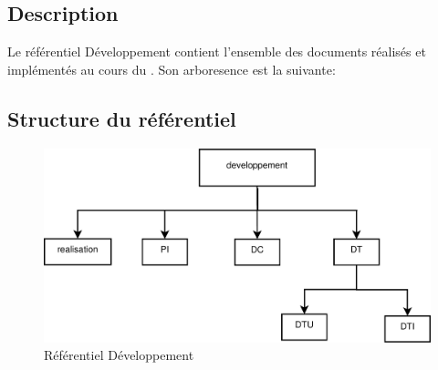 \subsection{Description}

Le référentiel Développement contient l’ensemble des documents réalisés et implémentés au cours du \picCourt. Son arboresence est la suivante:

\subsection{Structure du référentiel}

\begin{figure}[ht]
         \begin{center}
         \includegraphics[scale=0.5]{images/arboDeveloppement}
         \end{center}
         \caption{Référentiel Développement}
 \end{figure}
